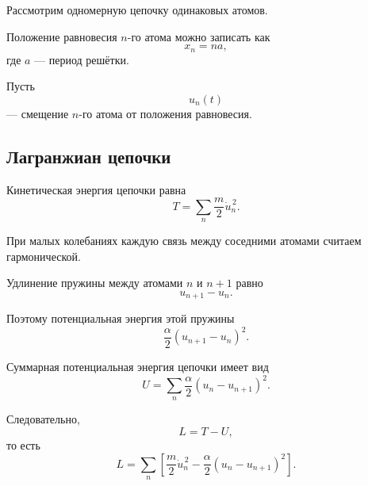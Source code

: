 \documentclass[../final.tex]{subfiles}
\begin{document}
Рассмотрим одномерную цепочку одинаковых атомов.

Положение равновесия $n$-го атома можно записать как
%
\begin{equation*}
    x_n=na,
\end{equation*}
%
где $a$ --- период решётки.

Пусть
%
\begin{equation*}
    u_n(t)
\end{equation*}
%
--- смещение $n$-го атома от положения равновесия.



\subsection*{Лагранжиан цепочки}

Кинетическая энергия цепочки равна
%
\begin{equation*}
    T
    =
    \sum_n
    \frac{m}{2}
    \dot u_n^{\,2}.
\end{equation*}

При малых колебаниях каждую связь между соседними атомами
считаем гармонической.

Удлинение пружины между атомами $n$ и $n+1$ равно
%
\begin{equation*}
    u_{n+1}-u_n.
\end{equation*}

Поэтому потенциальная энергия этой пружины
%
\begin{equation*}
    \frac{\alpha}{2}
    (u_{n+1}-u_n)^2.
\end{equation*}

Суммарная потенциальная энергия цепочки имеет вид
%
\begin{equation*}
    U
    =
    \sum_n
    \frac{\alpha}{2}
    (u_n-u_{n+1})^2.
\end{equation*}

Следовательно,
%
\begin{equation*}
    L=T-U,
\end{equation*}
%
то есть
%
\begin{equation*}
    \boxed{
        L
        =
        \sum_n
        \left[
            \frac{m}{2}\dot u_n^{\,2}
            -
            \frac{\alpha}{2}
            (u_n-u_{n+1})^2
        \right]
    }.
\end{equation*}


\end{document}
